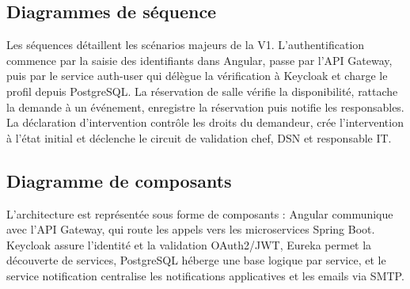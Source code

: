 \subsection{Diagrammes de séquence}

Les séquences détaillent les scénarios majeurs de la V1. L'authentification commence par la saisie des identifiants dans Angular, passe par l'API Gateway, puis par le service auth-user qui délègue la vérification à Keycloak et charge le profil depuis PostgreSQL. La réservation de salle vérifie la disponibilité, rattache la demande à un événement, enregistre la réservation puis notifie les responsables. La déclaration d'intervention contrôle les droits du demandeur, crée l'intervention à l'état initial et déclenche le circuit de validation chef, DSN et responsable IT.

\subsection{Diagramme de composants}

L'architecture est représentée sous forme de composants : Angular communique avec l'API Gateway, qui route les appels vers les microservices Spring Boot. Keycloak assure l'identité et la validation OAuth2/JWT, Eureka permet la découverte de services, PostgreSQL héberge une base logique par service, et le service notification centralise les notifications applicatives et les emails via SMTP.
